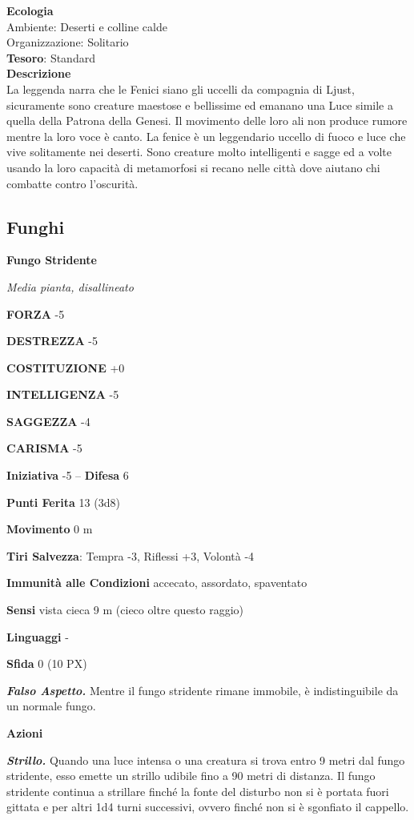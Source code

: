 \begin{multicols}{2}
\textbf{Ecologia}\\
Ambiente: Deserti e colline calde\\
Organizzazione: Solitario\\
\textbf{Tesoro}: Standard\\
\textbf{Descrizione}\\
La leggenda narra che le Fenici siano gli uccelli da compagnia di Ljust, sicuramente sono creature maestose e bellissime ed emanano una Luce simile a quella della Patrona della Genesi. Il movimento delle loro ali non produce rumore mentre la loro voce è canto. La fenice è un leggendario uccello di fuoco e luce che vive solitamente nei deserti. Sono creature molto intelligenti e sagge ed a volte usando la loro capacità di metamorfosi si recano nelle città dove aiutano chi combatte contro l'oscurità.

\subsection{Funghi}

\medskip{}\textbf{Fungo Stridente}

\textit{Media pianta, disallineato}

\textbf{FORZA} -5

\textbf{DESTREZZA} -5

\textbf{COSTITUZIONE} +0

\textbf{INTELLIGENZA} -5

\textbf{SAGGEZZA} -4

\textbf{CARISMA} -5

\textbf{Iniziativa} -5 -- \textbf{Difesa} 6

\textbf{Punti Ferita} 13 (3d8)

\textbf{Movimento} 0 m

\textbf{Tiri Salvezza}: Tempra -3, Riflessi +3, Volontà -4

\textbf{Immunità alle Condizioni} accecato, assordato, spaventato

\textbf{Sensi} vista cieca 9 m (cieco oltre questo raggio)

\textbf{Linguaggi} -

\textbf{Sfida} 0 (10 PX)

\textit{\textbf{Falso Aspetto.}} Mentre il fungo stridente rimane immobile, è indistinguibile da un normale fungo.

\textbf{Azioni}

\textit{\textbf{Strillo.}} Quando una luce intensa o una creatura si trova entro 9 metri dal fungo stridente, esso emette un strillo udibile fino a 90 metri di distanza. Il fungo stridente continua a strillare finché la fonte del disturbo non si è portata fuori gittata e per altri 1d4 turni successivi, ovvero finché non si è sgonfiato il cappello.


\end{multicols}
